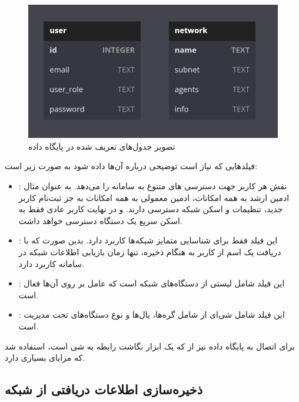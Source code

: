 \begin{figure}[!h]
    \centering\includegraphics[scale=.60]{./db}
    \caption{تصویر جدول‌های تعریف شده در پایگاه داده }\label{fig.121}
\end{figure}


فیلدهایی که نیاز است توضیحی درباره آن‌ها داده شود به صورت زیر است:

\begin{itemize}
    \item {}: نقش هر کاربر جهت دسترسی ‌های متنوع به سامانه را می‌دهد. به عنوان مثال ادمین ارشد به همه امکانات، ادمین معمولی به همه امکانات به جز ثبت‌نام کاربر جدید، تنظیمات و اسکن شبکه دسترسی دارند. و در نهایت کاربر عادی فقط به اسکن سریع یک دستگاه دسترسی خواهد داشت.
    \item {}: این فیلد فقط برای شناسایی متمایز شبکه‌ها کاربرد دارد. بدین صورت که با دریافت یک اسم از کاربر به هنگام ذخیره، تنها زمان بازیابی اطلاعات شبکه در سامانه کاربرد دارد.
    \item {}: این فیلد شامل لیستی از دستگاه‌های شبکه است که عامل  بر روی آن‌ها فعال است.
    \item {}: این فیلد شامل شی‌ای از  شامل گره‌ها، یال‌ها و نوع دستگاه‌های تحت مدیریت است.

\end{itemize}


برای اتصال به پایگاه داده  نیز از  که یک ابزار نگاشت رابطه به شی است، استفاده شد که مزایای بسیاری دارد.



\subsection{ذخیره‌سازی اطلاعات دریافتی از شبکه}

